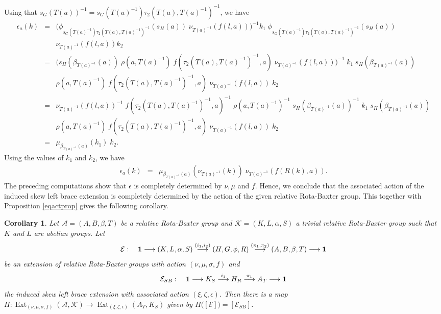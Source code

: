 \documentclass[11pt]{amsart}
\theoremstyle{thrm}
\theoremstyle{plain}
\newtheorem{cor}[thm]{Corollary}
\theoremstyle{definition}
\newcommand{\Ext}{\operatorname{Ext} }
\numberwithin{equation}{section}
\begin{document}
	Using that $s_G(T(a))^{-1}=s_G(T(a)^{-1}) \tau_2(T(a), T(a)^{-1})^{-1}$, we have
	\begin{eqnarray*}
		\epsilon_a(k) &=& \big(\phi_{s_G(T(a)^{-1})  \tau_2(T(a), T(a)^{-1})^{-1} } (s_H(a))\; \nu_{T(a)^{-1}}(f(l,a))\big)^{-1} k_1 \; \phi_{s_G(T(a)^{-1})  \tau_2(T(a), T(a)^{-1})^{-1} } (s_H(a))\\
		&& \nu_{T(a)^{-1}}(f(l,a)) k_2\\
		&=& \big(s_H (\beta_{T(a)^{-1}}(a))\; \rho(a, T(a)^{-1}) \; f(\tau_2(T(a), T(a)^{-1})^{-1}, a)\; \nu_{T(a)^{-1}}(f(l,a))\big)^{-1}\; k_1 \; s_H (\beta_{T(a)^{-1}}(a))\\
		&&  \rho(a, T(a)^{-1}) \; f(\tau_2(T(a), T(a)^{-1})^{-1}, a)\; \nu_{T(a)^{-1}}(f(l,a))\; k_2\\
		&=& \nu_{T(a)^{-1}}(f(l,a))^{-1}\; f(\tau_2(T(a), T(a)^{-1})^{-1}, a)^{-1}\;\rho(a, T(a)^{-1})^{-1}\; s_H (\beta_{T(a)^{-1}}(a))^{-1}\;  k_1 \; s_H (\beta_{T(a)^{-1}}(a))\\
		&&  \rho(a, T(a)^{-1})\;  f(\tau_2(T(a), T(a)^{-1})^{-1}, a)\; \nu_{T(a)^{-1}}(f(l,a))\; k_2\\
		&=& \mu_{\beta_{T(a)^{-1}}(a)}(k_1) \; k_2.
	\end{eqnarray*}
	Using the values of $k_1$ and $k_2$, we have
	\begin{eqnarray}\label{epsilonf}
		\epsilon_a(k) &=&  \mu_{\beta_{T(a)^{-1}}(a)}(\nu_{T(a)^{-1}}(k)) \; \nu_{T(a)^{-1}}(f(R(k), a)).
	\end{eqnarray}
The preceding computations show that $\epsilon$ is completely determined by $\nu, \mu$ and  $f$. Hence, we conclude that the associated action of the induced skew left brace extension is completely determined by the action of the given relative Rota-Baxter group. This together with Proposition \ref{eqactprop} gives the following corollary.

\begin{cor}\label{RRB2sbext}
	Let $\mathcal{A}= (A,B, \beta, T)$ be a relative Rota-Baxter group and $\mathcal{K}=  (K,L,\alpha,S )$ a trivial relative Rota-Baxter group such that $K$ and $L$ are abelian groups. Let  
	$$\mathcal{E} : \quad {\bf 1} \longrightarrow (K,L,\alpha,S ) \stackrel{(i_1, i_2)}{\longrightarrow}  (H,G, \phi, R) \stackrel{(\pi_1, \pi_2)}{\longrightarrow} (A,B, \beta, T) \longrightarrow {\bf 1}$$
	be an extension of relative Rota-Baxter groups with action $(\nu, \mu, \sigma, f)$ and 
	$$\mathcal{E}_{SB}: \quad {\bf 1} \longrightarrow K_{S} \stackrel{i_1}{\longrightarrow}  H_{R} \stackrel{\pi_1}{\longrightarrow} A_{T} \longrightarrow {\bf 1}$$
	the induced skew left brace extension with associated action $(\xi, \zeta, \epsilon)$.  Then there is a map $\Pi: \Ext_{(\nu, \mu, \sigma, f)}(\mathcal{A}, \mathcal{K}) \to \Ext_{(\xi, \zeta, \epsilon)}(A_T, K_S)$ given by  $\Pi\big([\mathcal{E}] \big)= [\mathcal{E}_{SB}]$.
\end{cor}
\end{document}
